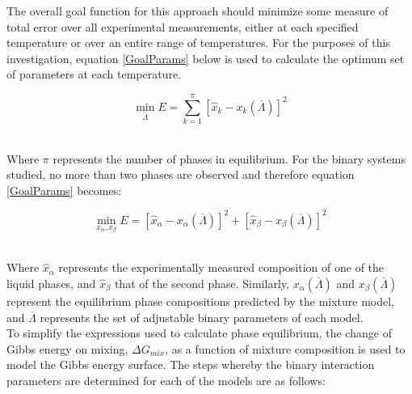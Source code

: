 The overall goal function for this approach should minimize some measure of total error over all experimental measurements, either at each specified temperature or over an entire range of temperatures. For the purposes of this investigation, equation \ref{GoalParams} below is used to calculate the optimum set of parameters at each temperature.\

\begin{equation}
\min_{\overline{\Lambda}} E = \sum_{k=1}^{\pi} \left[\hat{x}_{k}-x_{k}\left(\overline{\Lambda}\right)\right]^{2} \label{GoalParams}
\end{equation}\

Where $\pi$ represents the number of phases in equilibrium. For the binary systems studied, no more than two phases are observed and therefore equation \ref{GoalParams} becomes:\

\begin{equation}
\min_{ x_{\alpha}, x_{\beta}} E = \left[\hat{x}_{\alpha}-x_{\alpha}\left(\overline{\Lambda}\right)\right]^{2} + \left[\hat{x}_{\beta}-x_{\beta}\left(\overline{\Lambda}\right) \right]^{2} \label{GoalParamsBinary}
\end{equation}\

Where $\hat{x}_{\alpha}$ represents the experimentally measured composition of one of the liquid phases, and $\hat{x}_{\beta}$ that of the second phase. Similarly, $x_{\alpha}\left(\overline{\Lambda}\right)$ and $x_{\beta}\left(\overline{\Lambda}\right)$ represent the equilibrium phase compositions predicted by the mixture model, and $\overline{\Lambda}$ represents the set of adjustable binary parameters of each model.\\

To simplify the expressions used to calculate phase equilibrium, the change of Gibbs energy on mixing, $\Delta G_{mix}$, as a function of mixture composition is used to model the Gibbs energy surface. The steps whereby the binary interaction parameters are determined for each of the models are as follows:\

